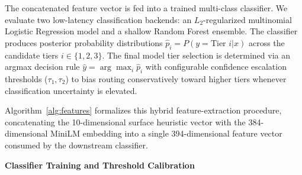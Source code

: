 \documentclass[runningheads]{llncs}
\begin{document}
The concatenated feature vector is fed into a trained multi-class classifier. We evaluate two low-latency classification backends: an $L_2$-regularized multinomial Logistic Regression model and a shallow Random Forest ensemble. The classifier produces posterior probability distributions $\hat{p}_i = P(y = \text{Tier } i | x)$ across the candidate tiers $i \in \{1, 2, 3\}$. The final model tier selection is determined via an argmax decision rule $\hat{y} = \arg\max_i \hat{p}_i$ with configurable confidence escalation thresholds ($\tau_1, \tau_2$) to bias routing conservatively toward higher tiers whenever classification uncertainty is elevated.

Algorithm~\ref{alg:features} formalizes this hybrid feature-extraction procedure, concatenating the 10-dimensional surface heuristic vector with the 384-dimensional MiniLM embedding into a single 394-dimensional feature vector consumed by the downstream classifier.

\begin{algorithm}[H]
\caption{Hybrid Prompt Feature Extraction Algorithm}
\label{alg:features}
\end{algorithm}

\vspace{1em}
\noindent\textbf{Classifier Training and Threshold Calibration}
\end{document}
